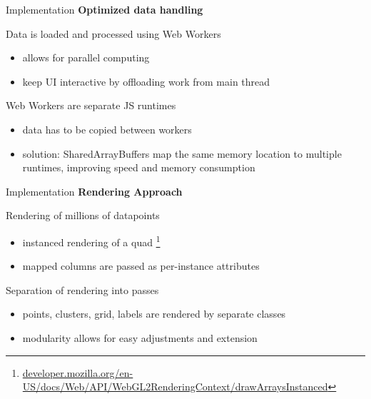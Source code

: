 \documentclass[aspectratio=169,10pt,english]{beamer}
\begin{document}
\begin{frame}[t]{Implementation}
	\bigskip
	\huge\textbf{Optimized data handling}
	
	\large\bigskip
	Data is loaded and processed using Web Workers
	\begin{itemize}
		\item allows for parallel computing
		\item keep UI interactive by offloading work from main thread
	\end{itemize}

	\bigskip
	Web Workers are separate JS runtimes
	\begin{itemize}
		\item data has to be copied between workers
		\item solution: SharedArrayBuffers map the same memory location to multiple runtimes, improving speed and memory consumption
	\end{itemize}
\end{frame}

\begin{frame}[t]{Implementation}
	\bigskip
	\huge\textbf{Rendering Approach}
	
	\large\bigskip
	Rendering of millions of datapoints
	\begin{itemize}
		\item instanced rendering of a quad
		\footnote{\href{https://developer.mozilla.org/en-US/docs/Web/API/WebGL2RenderingContext/drawArraysInstanced}{developer.mozilla.org/en-US/docs/Web/API/WebGL2RenderingContext/drawArraysInstanced}}
		\item mapped columns are passed as per-instance attributes
	\end{itemize}
	
	\bigskip
	Separation of rendering into passes
	\begin{itemize}
		\item points, clusters, grid, labels are rendered by separate classes
		\item modularity allows for easy adjustments and extension
	\end{itemize}
\end{frame}
\end{document}
